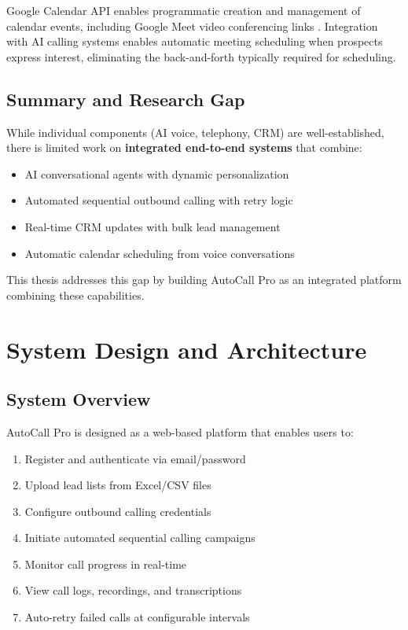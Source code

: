 \documentclass[12pt,a4paper,oneside]{book}
\begin{document}
Google Calendar API enables programmatic creation and management of calendar events, including Google Meet video conferencing links \citep{googlecalendar2024}. Integration with AI calling systems enables automatic meeting scheduling when prospects express interest, eliminating the back-and-forth typically required for scheduling.

\section{Summary and Research Gap}

While individual components (AI voice, telephony, CRM) are well-established, there is limited work on \textbf{integrated end-to-end systems} that combine:
\begin{itemize}
    \item AI conversational agents with dynamic personalization
    \item Automated sequential outbound calling with retry logic
    \item Real-time CRM updates with bulk lead management
    \item Automatic calendar scheduling from voice conversations
\end{itemize}

This thesis addresses this gap by building AutoCall Pro as an integrated platform combining these capabilities.


\chapter{System Design and Architecture}

\section{System Overview}

AutoCall Pro is designed as a web-based platform that enables users to:
\begin{enumerate}
    \item Register and authenticate via email/password
    \item Upload lead lists from Excel/CSV files
    \item Configure outbound calling credentials
    \item Initiate automated sequential calling campaigns
    \item Monitor call progress in real-time
    \item View call logs, recordings, and transcriptions
    \item Auto-retry failed calls at configurable intervals
\end{enumerate}
\end{document}
